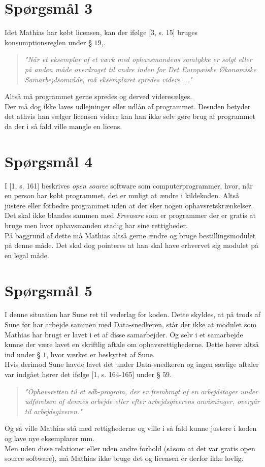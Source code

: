 \documentclass[12pt]{article}
\begin{document}
\section*{Spørgsmål 3}
Idet Mathias har købt licensen, kan der ifølge [3, s. 15] bruges konsumptionsreglen under § $19$,.
\begin{quote}
\textit{"Når et eksemplar af et værk med ophavsmandens samtykke er solgt eller på anden måde overdraget til andre inden for Det Europæiske Økonomiske Samarbejdsområde, må eksemplaret spredes videre ..."}
\end{quote}
Altså må programmet gerne spredes og derved videresælges. \\
Der må dog ikke laves udlejninger eller udlån af programmet. Desuden betyder det athvis  han sælger licensen videre kan han ikke selv gøre brug af programmet da der i så fald ville mangle en licens.

\section*{Spørgsmål 4}
I [1, s. 161] beskrives \textit{open source} software som computerprogrammer, hvor, når en person har købt programmet, det er muligt at ændre i kildekoden. Altså justere eller forbedre programmet uden at der sker nogen ophavsretskrænkelser. Det skal ikke blandes sammen med \textit{Freeware} som er programmer der er gratis at bruge men hvor ophavsmanden stadig har sine rettigheder.\\
På baggrund af dette må Mathias altså gerne ændre og bruge bestillingsmodulet på denne måde. Det skal dog pointeres at han skal have erhvervet sig modulet på en legal måde.

\section*{Spørgsmål 5}
I denne situation har Sune ret til vederlag for koden. Dette skyldes, at på trods af Sune før har arbejde sammen med Data-snedkeren, står der ikke at modulet som Mathias har brugt er lavet i et af disse samarbejder. Og selv i et samarbejde kunne der være lavet en skriftlig aftale om ophavsrettighederne. Dette hører altså ind under § $1$, hvor værket er beskyttet af Sune.\\
Hvis derimod Sune havde lavet det under Data-snedkeren og ingen særlige aftaler var indgået hører det ifølge [1, s. 164-165] under § $59$.
\begin{quote}
\textit{"Ophavsretten til et edb-program, der er frembragt af en arbejdstager under udførelsen af dennes arbejde eller efter arbejdsgiverens anvisninger, overgår til arbejdsgiveren."}
\end{quote}
Og så ville Mathias stå med rettighederne og ville i så fald kunne justere i koden og lave nye eksemplarer mm.\\
Men uden disse relationer eller uden andre forhold (såsom at det var gratis open source software), må Mathias ikke bruge det og licensen er derfor ikke lovlig.
\end{document}
